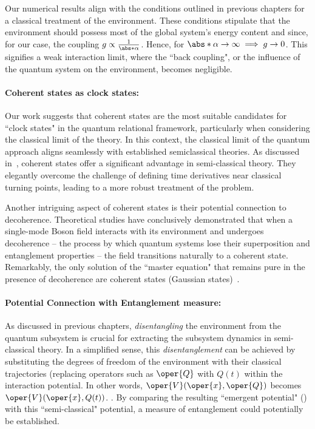 Our numerical results align with the conditions outlined in previous chapters for a classical treatment of the environment. These conditions stipulate that the environment should possess most of the global system's energy content and since, for our case, the coupling \(g \propto \frac{1}{\abs*{\alpha}}\). Hence, for \(\abs*{\alpha} \to \infty \implies g \to 0\). This signifies a weak interaction limit, where the ``back coupling", or the influence of the quantum system on the environment, becomes negligible.

\paragraph{Coherent states as clock states:} Our work suggests that coherent states are the most suitable candidates for ``clock states" in the quantum relational framework, particularly when considering the classical limit of the theory. In this context, the classical limit of the quantum approach aligns seamlessly with established semiclassical theories. As discussed in~\cite{braun2004classical}, coherent states offer a significant advantage in semi-classical theory. They elegantly overcome the challenge of defining time derivatives near classical turning points, leading to a more robust treatment of the problem. 

Another intriguing aspect of coherent states is their potential connection to decoherence. Theoretical studies have conclusively demonstrated that when a single-mode Boson field interacts with its environment and undergoes decoherence – the process by which quantum systems lose their superposition and entanglement properties – the field transitions naturally to a coherent state. Remarkably, the only solution of the ``master equation" that remains pure in the presence of decoherence are coherent states (Gaussian states)~\cite{dutra1998decoherence, zuerk_coherent_state_1993}. 

\paragraph{Potential Connection with Entanglement measure: } As discussed in previous chapters, \textit{disentangling} the environment from the quantum subsystem is crucial for extracting the subsystem dynamics in semi-classical theory.  In a simplified sense, this \textit{disentanglement} can be achieved by substituting the degrees of freedom of the environment with their classical trajectories (replacing operators such as $\oper{Q}$ with $Q (t)$ within the interaction potential. In other words, $\oper{V}(\oper{x}, \oper{Q})$ becomes $\oper{V}(\oper{x}, Q(t))$. . By comparing the resulting ``emergent potential" () with this ``semi-classical" potential, a measure of entanglement could potentially be established.



